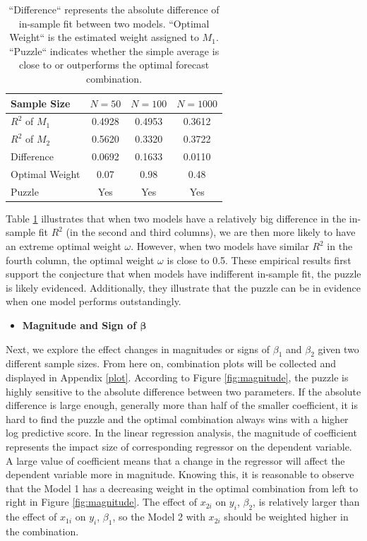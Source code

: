 \documentclass{monashthesis}
\begin{document}
\begin{table}[ht]
  \centering
    \begin{tabular}{l|ccc}
    \toprule
    Sample Size      &   $N=50$    &    $N=100$   &  $N=1000$  \\
    \midrule
    $R^2$ of $M_1$   &   0.4928    &    0.4953    &   0.3612   \\
    $R^2$ of $M_2$   &   0.5620    &    0.3320    &   0.3722   \\
    Difference       &   0.0692    &    0.1633    &   0.0110   \\
    Optimal Weight   &    0.07     &     0.98     &    0.48    \\
    Puzzle           &    Yes      &     Yes      &    Yes     \\
    \bottomrule
    \end{tabular}
  \caption{``Difference`` represents the absolute difference of in-sample fit between two models. ``Optimal Weight`` is the estimated weight assigned to $M_1$. ``Puzzle`` indicates whether the simple average is close to or outperforms the optimal forecast combination.}
  \label{tab:size}
\end{table}

Table \ref{tab:size} illustrates that when two models have a relatively big difference in the in-sample fit \(R^2\) (in the second and third columns), we are then more likely to have an extreme optimal weight \(\omega\). However, when two models have similar \(R^2\) in the fourth column, the optimal weight \(\omega\) is close to 0.5. These empirical results first support the conjecture that when models have indifferent in-sample fit, the puzzle is likely evidenced. Additionally, they illustrate that the puzzle can be in evidence when one model performs outstandingly.

\begin{itemize}
\tightlist
\item
  \bf{Magnitude and Sign of $\pmb{\beta}$}
\end{itemize}

Next, we explore the effect changes in magnitudes or signs of \(\beta_1\) and \(\beta_2\) given two different sample sizes. From here on, combination plots will be collected and displayed in Appendix \ref{plot}. According to Figure \ref{fig:magnitude}, the puzzle is highly sensitive to the absolute difference between two parameters. If the absolute difference is large enough, generally more than half of the smaller coefficient, it is hard to find the puzzle and the optimal combination always wins with a higher log predictive score. In the linear regression analysis, the magnitude of coefficient represents the impact size of corresponding regressor on the dependent variable. A large value of coefficient means that a change in the regressor will affect the dependent variable more in magnitude. Knowing this, it is reasonable to observe that the Model 1 has a decreasing weight in the optimal combination from left to right in Figure \ref{fig:magnitude}. The effect of \(x_{2i}\) on \(y_i\), \(\beta_2\), is relatively larger than the effect of \(x_{1i}\) on \(y_i\), \(\beta_1\), so the Model 2 with \(x_{2i}\) should be weighted higher in the combination.
\end{document}
